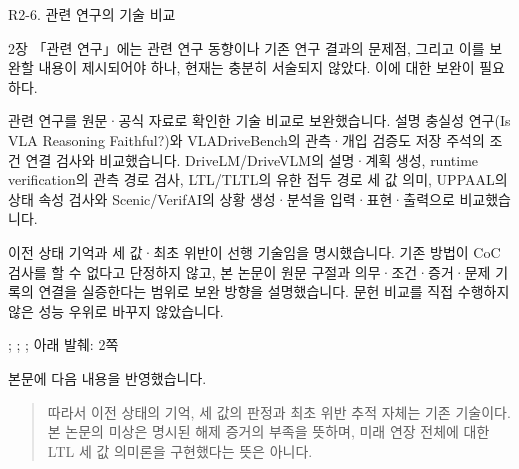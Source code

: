 \begin{reviewitem}{R2-6. 관련 연구의 기술 비교}

\begin{reviewercomment}

2장 「관련 연구」에는 관련 연구 동향이나 기존 연구 결과의 문제점, 그리고 이를 보완할 내용이 제시되어야 하나, 현재는 충분히 서술되지 않았다. 이에 대한 보완이 필요하다.

\end{reviewercomment}

\begin{authorresponse}

관련 연구를 원문·공식 자료로 확인한 기술 비교로 보완했습니다. 설명 충실성 연구(Is VLA Reasoning Faithful?)와 VLADriveBench의 관측·개입 검증도 저장 주석의 조건 연결 검사와 비교했습니다. DriveLM/DriveVLM의 설명·계획 생성, runtime verification의 관측 경로 검사, LTL/TLTL의 유한 접두 경로 세 값 의미, UPPAAL의 상태 속성 검사와 Scenic/VerifAI의 상황 생성·분석을 입력·표현·출력으로 비교했습니다.

이전 상태 기억과 세 값·최초 위반이 선행 기술임을 명시했습니다. 기존 방법이 CoC 검사를 할 수 없다고 단정하지 않고, 본 논문이 원문 구절과 의무·조건·증거·문제 기록의 연결을 실증한다는 범위로 보완 방향을 설명했습니다. 문헌 비교를 직접 수행하지 않은 성능 우위로 바꾸지 않았습니다.

\end{authorresponse}

\begin{manuscriptrevision}{; ; ; 아래 발췌: 2쪽}

본문에 다음 내용을 반영했습니다.

\begin{quote}

따라서 이전 상태의 기억, 세 값의 판정과 최초 위반 추적 자체는 기존 기술이다. 본 논문의 미상은 명시된 해제 증거의 부족을 뜻하며, 미래 연장 전체에 대한 LTL 세 값 의미론을 구현했다는 뜻은 아니다.

\end{quote}

\end{manuscriptrevision}

\end{reviewitem}

\clearpage

